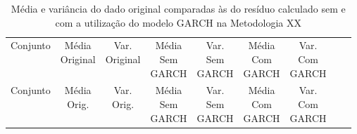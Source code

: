 \clearpage

\begin{center}
\begin{longtable}{ccccccccc}
\toprule
\rowcolor{white}
\caption[Metodologia XX: dados estatísticos]{Média e variância do dado original
comparadas às do resíduo calculado sem e com a utilização do modelo GARCH na
Metodologia XX} \label{tab:DadosEstatisticosMet20}\\
\midrule
    Conjunto & \specialcell{Média\\Original} &
    \specialcell{Var.\\Original} & \specialcell{Média\\Sem\\GARCH} &
    \specialcell{Var.\\Sem\\GARCH} & \specialcell{Média\\Com\\GARCH}&
    \specialcell{Var.\\Com\\GARCH} \\

\midrule
\endfirsthead 
\midrule
\rowcolor{white}
    Conjunto & \specialcell{Média\\Orig.} &
    \specialcell{Var.\\Orig.} & \specialcell{Média\\Sem\\GARCH} &
    \specialcell{Var.\\Sem\\GARCH} & \specialcell{Média\\Com\\GARCH}&
    \specialcell{Var.\\Com\\GARCH} \\


\end{longtable}
\end{center}
